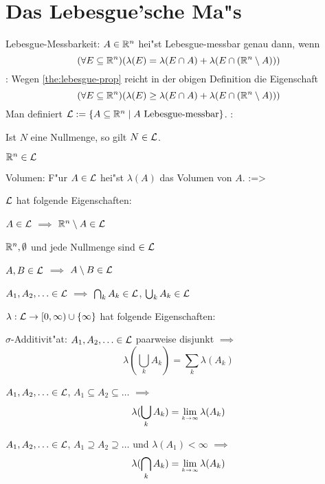 \section{Das Lebesgue'sche Ma"s}
 Lebesgue-Messbarkeit:{
  $A\in\mathbb R^n$ hei"st Lebesgue-messbar genau dann, wenn
  \[(\forall E\subseteq\mathbb R^n)(\lambda(E)=\lambda(E\cap A)+
    \lambda(E\cap(\mathbb R^n\setminus A)))
    \]
  }
\remark:{
  Wegen \ref{the:lebesgue-prop} reicht in der obigen Definition die
  Eigenschaft
  \[(\forall E\subseteq\mathbb R^n)(\lambda(E)\geq\lambda(E\cap A)+
    \lambda(E\cap(\mathbb R^n\setminus A)))
    \]
  Man definiert $\mathcal{L}:=\{A\subseteq\mathbb R^n\mid A \text{ Lebesgue-messbar\}}$.
  }
\example:{
  \begin{stmts}
    \item Ist $N$ eine Nullmenge, so gilt $N\in\mathcal{L}$.
    \item $\mathbb R^n\in\mathcal{L}$
    \end{stmts}
  }
 Volumen:{
  F"ur $A\in\mathcal{L}$ hei"st $\lambda(A)$ das Volumen von $A$.
  }
\theorem:=>{
  $\mathcal{L}$ hat folgende Eigenschaften:
  \begin{stmts}
    \item $A\in\mathcal{L}$ $\implies$ $\mathbb R^n\setminus A\in\mathcal{L}$
    \item $\mathbb R^n,\emptyset$ und jede Nullmenge sind $\in\mathcal{L}$
    \item $A,B\in\mathcal{L}$ $\implies$ $A\setminus B\in\mathcal{L}$
    \item $A_1,A_2,\ldots\in\mathcal{L}$ $\implies$
      $\bigcap_k A_k\in\mathcal{L}$, $\bigcup_k A_k\in\mathcal{L}$
    \end{stmts}
  $\lambda:\mathcal{L}\to[0,\infty)\cup\{\infty\}$ hat folgende Eigenschaften:
  \begin{stmts}
    \item $\sigma$-Additivit"at: $A_1,A_2,\ldots\in\mathcal{L}$ paarweise 
      disjunkt $\implies$
      \[\lambda(\bigcup_k A_k)=\sum_k \lambda(A_k)
        \]
    \item $A_1,A_2,\ldots\in\mathcal{L}$, $A_1\subseteq A_2 \subseteq \ldots$ $\implies$
      \[\lambda(\bigcup_k A_k)=\limes k->\infty \lambda(A_k)
        \]
    \item $A_1,A_2,\ldots\in\mathcal{L}$, $A_1\supseteq A_2 \supseteq \ldots$ 
      und $\lambda(A_1)<\infty$ $\implies$
      \[\lambda(\bigcap_k A_k)=\limes k->\infty \lambda(A_k)
        \]
    \end{stmts}
  } 
